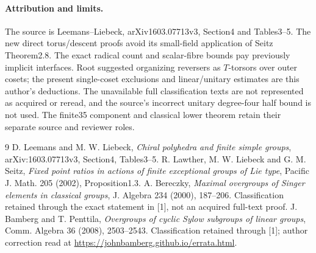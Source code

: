 \documentclass[10pt]{article}
\begin{document}
\paragraph{Attribution and limits.}
The source is Leemans--Liebeck, arXiv1603.07713v3, Section4 and Tables3--5.
The new direct torus/descent proofs avoid its small-field application of
Seitz Theorem2.8. The exact radical count and scalar-fibre bounds pay
previously implicit interfaces. Root suggested organizing reversers as
$T$-torsors over outer cosets; the present single-coset exclusions and
linear/unitary estimates are this author's deductions. The unavailable full
classification texts are not represented as acquired or reread, and the source's
incorrect unitary degree-four half bound is not used. The finite35 component
and classical lower theorem retain their separate source and reviewer roles.
\begin{thebibliography}{9}
 D. Leemans and M. W. Liebeck, \emph{Chiral polyhedra and finite
simple groups}, arXiv:1603.07713v3, Section4, Tables3--5.
 R. Lawther, M. W. Liebeck and G. M. Seitz,
\emph{Fixed point ratios in actions of finite exceptional groups of Lie type},
Pacific J. Math. 205 (2002), Proposition1.3.
 A. Bereczky, \emph{Maximal overgroups of Singer elements in
classical groups}, J. Algebra 234 (2000), 187--206. Classification retained
through the exact statement in [1], not an acquired full-text proof.
 J. Bamberg and T. Penttila, \emph{Overgroups of cyclic Sylow
subgroups of linear groups}, Comm. Algebra 36 (2008), 2503--2543.
Classification retained through [1]; author correction read at
\url{https://johnbamberg.github.io/errata.html}.
\end{thebibliography}
\end{document}

